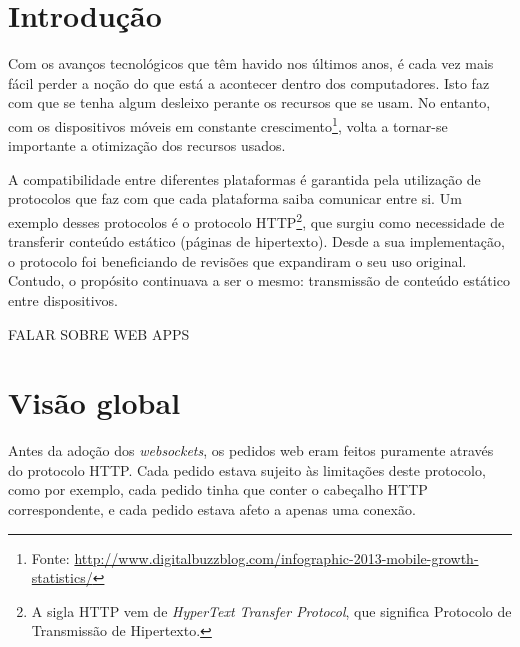\documentclass[a4paper]{article}
\begin{document}

\newpage
\thispagestyle{empty} %

\tableofcontents

\newpage
\setcounter{page}{1} %

\section{Introdução}

Com os avanços tecnológicos que têm havido nos últimos anos, é cada vez mais fácil perder a noção
do que está a acontecer dentro dos computadores. Isto faz com que se tenha algum desleixo perante os recursos que se usam. No entanto, com os dispositivos móveis em constante crescimento\footnote{Fonte: \url{http://www.digitalbuzzblog.com/infographic-2013-mobile-growth-statistics/}}, volta a tornar-se importante a otimização dos recursos usados.

A compatibilidade entre diferentes plataformas é garantida pela utilização de protocolos que faz com que cada plataforma saiba comunicar entre si. Um exemplo desses protocolos é o protocolo HTTP\footnote{A sigla HTTP vem de \emph{HyperText Transfer Protocol}, que significa Protocolo de Transmissão de Hipertexto.}, que surgiu como necessidade de transferir conteúdo estático (páginas de hipertexto). Desde a sua implementação, o protocolo foi beneficiando de revisões que expandiram o seu uso original. Contudo, o propósito continuava a ser o mesmo: transmissão de conteúdo estático entre dispositivos. 

FALAR SOBRE WEB APPS

\section{Visão global}

Antes da adoção dos \emph{websockets}, os pedidos web eram feitos puramente através do protocolo HTTP. Cada pedido estava sujeito às limitações deste protocolo, como por exemplo, cada pedido tinha que conter o cabeçalho HTTP correspondente, e cada pedido estava afeto a apenas uma conexão.
\end{document}
